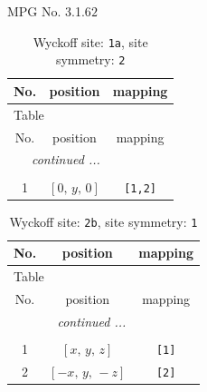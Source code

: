 \documentclass[fleqn,8pt]{jsarticle}
\begin{document}
\setcounter{MaxMatrixCols}{32}

\renewcommand{\tablename}{Table~}
\renewcommand{\figurename}{Figure~}
\begin{center}
\LARGE
MPG No. 3.1.6\quad$2$
\end{center}
\renewcommand{\arraystretch}{1.2}
\begin{longtable}{ccc}
\caption{Wyckoff site: {\tt 1a}, site symmetry: {\tt 2}}
 \\
 \hline \hline
No. & position & mapping \\ \hline \endfirsthead

\multicolumn{2}{l}{\tablename\ \thetable{}} \\
 \hline \hline
No. & position & mapping \\ \hline \endhead

 \hline \hline
\multicolumn{2}{r}{\footnotesize\it continued ...} \\ \endfoot

 \hline \hline
\multicolumn{2}{r}{} \\ \endlastfoot

1 & $\left[ 0,\, y,\, 0 \right]$ & {\tt [1,2]} \\
\end{longtable}
\renewcommand{\arraystretch}{1.2}
\begin{longtable}{ccc}
\caption{Wyckoff site: {\tt 2b}, site symmetry: {\tt 1}}
 \\
 \hline \hline
No. & position & mapping \\ \hline \endfirsthead

\multicolumn{2}{l}{\tablename\ \thetable{}} \\
 \hline \hline
No. & position & mapping \\ \hline \endhead

 \hline \hline
\multicolumn{2}{r}{\footnotesize\it continued ...} \\ \endfoot

 \hline \hline
\multicolumn{2}{r}{} \\ \endlastfoot

1 & $\left[ x,\, y,\, z \right]$ & {\tt [1]} \\ \hline
2 & $\left[ - x,\, y,\, - z \right]$ & {\tt [2]} \\
\end{longtable}
\end{document}
